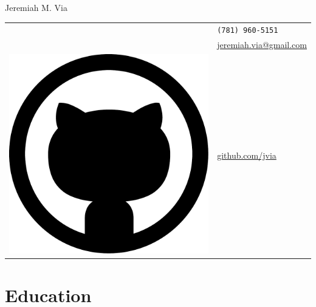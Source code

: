 \documentclass[10pt, letter]{article}
\newcommand*\github{\includegraphics[height=2ex]{github.pdf}}
\begin{document}
\begin{minipage}[t]{0.55\textwidth}
{\LARGE Jeremiah M. Via}
\end{minipage}
\begin{minipage}[t]{0.4\textwidth}
  \begin{tabular}[h]{ll}
  \Phone{}    & \texttt{(781) 960-5151}\\
  \Envelope{} & \href{mailto:jeremiah.via@gmail.com}{jeremiah.via@gmail.com}\\    
  \github{}   & \href{http://www.github.com/jvia}{github.com/jvia}
  \end{tabular}
\end{minipage}



\section*{Education}
\end{document}
